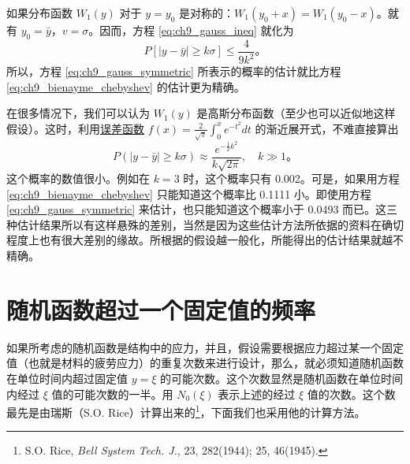 如果分布函数 $ W_1(y) $ 对于 $ y = y_0 $ 是对称的：$ W_1(y_0 + x) = W_1(y_0 - x) $。就有 $ y_0 = \bar{y} $，$ v = \sigma $。因而，方程 \eqref{eq:ch9_gauss_ineq} 就化为
\begin{equation}
\label{eq:ch9_gauss_symmetric}
P[|y - \bar{y}| \geq k\sigma] \leq \frac{4}{9k^2}。
\end{equation}
所以，方程 \eqref{eq:ch9_gauss_symmetric} 所表示的概率的估计就比方程 \eqref{eq:ch9_bienayme_chebyshev} 的估计更为精确。

在很多情况下，我们可以认为 $ W_1(y) $ 是高斯分布函数（至少也可以近似地这样假设）。这时，利用\underline{误差函数} $ f(x) = \frac{2}{\sqrt{\pi}} \int_0^x e^{-t^2} dt $ 的渐近展开式，不难直接算出
\begin{equation}\label{eq:ch9_gaussian_tail}
P(|y - \bar{y}| \geq k\sigma) \approx \frac{e^{-\frac{1}{2}k^2}}{k\sqrt{2\pi}}, \quad k \gg 1。
\end{equation}
这个概率的数值很小。例如在 $ k=3 $ 时，这个概率只有 0.002。可是，如果用方程 \eqref{eq:ch9_bienayme_chebyshev} 只能知道这个概率比 0.1111 小。即使用方程 \eqref{eq:ch9_gauss_symmetric} 来估计，也只能知道这个概率小于 0.0493 而已。这三种估计结果所以有这样悬殊的差别，当然是因为这些估计方法所依据的资料在确切程度上也有很大差别的缘故。所根据的假设越一般化，所能得出的估计结果就越不精确。

\section{随机函数超过一个固定值的频率}\label{ch9_sec7_function}

如果所考虑的随机函数是结构中的应力，并且，假设需要根据应力超过某一个固定值（也就是材料的疲劳应力）的重复次数来进行设计，那么，就必须知道随机函数在单位时间内超过固定值 $ y = \xi $ 的可能次数。这个次数显然是随机函数在单位时间内经过 $\xi$ 值的可能次数的一半。用 $ N_0(\xi) $ 表示上述的经过 $\xi$ 值的次数。这个数最先是由瑞斯（S.O. Rice）计算出来的\footnote{S.O. Rice, \emph{Bell System Tech. J.}, 23, 282(1944); 25, 46(1945).}，下面我们也采用他的计算方法。

